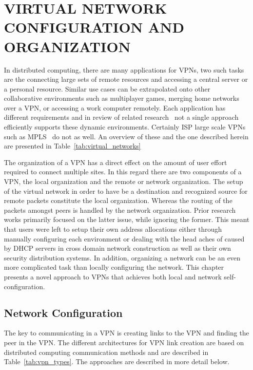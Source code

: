 \chapter{VIRTUAL NETWORK CONFIGURATION AND ORGANIZATION}
\label{chap:vpns}

In distributed computing, there are many applications for VPNs, two such tasks
are the connecting large sets of remote resources and accessing a central
server or a personal resource.  Similar use cases can be extrapolated onto
other collaborative environments such as multiplayer games, merging home
networks over a VPN, or accessing a work computer remotely.  Each application
has different requirements and in review of related research~\cite{ipop, vine,
violin, vnet, ocala, softudc, openvpn, hamachi, wippien, gbridge, pvc, tinc,
n2n, p2pvpn, l2tp} not a single approach efficiently supports these dynamic
environments.  Certainly ISP large scale VPNs such as MPLS~\cite{mpls} do not
as well.  An overview of these and the one described herein are presented in
Table~\ref{tab:virtual_networks}

The organization of a VPN has a direct effect on the amount of user effort
required to connect multiple sites.  In this regard there are two components of
a VPN, the local organization and the remote or network organization.  The setup
of the virtual network in order to have be a destination and recognized source
for remote packets constitute the local organization.  Whereas the routing of
the packets amongst peers is handled by the network organization.  Prior
research works primarily focused on the latter issue, while ignoring the former.
This meant that users were left to setup their own address allocations either
through manually configuring each environment or dealing with the head aches of
caused by DHCP servers in cross domain network construction as well as their
own security distribution systems.  In addition, organizing a network can be an
even more complicated task than locally configuring the network.  This chapter
presents a novel approach to VPNs that achieves both local and network
self-configuration.

\section{Network Configuration}
The key to communicating in a VPN is creating links to the VPN and finding
the peer in the VPN.  The different architectures for VPN link creation are
based on distributed computing communication methods and are described in
Table~\ref{tab:vpn_types}.  The approaches are described in more detail
below.


